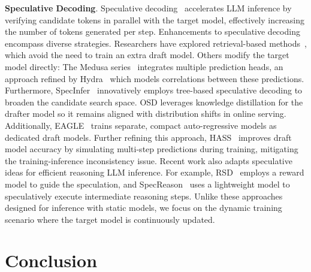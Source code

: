 \documentclass[sigplan,screen]{acmart}
\begin{document}


\noindent\textbf{Speculative Decoding}.
Speculative decoding~\cite{SpeculativeDecoding, chen2023accelerating, AdaServe} accelerates LLM inference by verifying candidate tokens in parallel with the target model, effectively increasing the number of tokens generated per step. Enhancements to speculative decoding encompass diverse strategies. Researchers have explored retrieval-based methods~\cite{REST, saxena2023PLD, lookahead}, which avoid the need to train an extra draft model. Others modify the target model directly: The Medusa series~\cite{Medusa} integrates multiple prediction heads, an approach refined by Hydra~\cite{Hydra} which models correlations between these predictions. Furthermore, SpecInfer~\cite{SpecInfer} innovatively employs tree-based speculative decoding to broaden the candidate search space. OSD \cite{OSD} leverages knowledge distillation for the drafter model so it remains aligned with distribution shifts in online serving.  Additionally, EAGLE~\cite{Eagle1, Eagle2, Eagle3} trains separate, compact auto-regressive models as dedicated draft models. Further refining this approach, HASS~\cite{HASS} improves draft model accuracy by simulating multi-step predictions during training, mitigating the training-inference inconsistency issue. Recent work also adapts speculative ideas for efficient reasoning LLM inference. For example, RSD~\cite{RSD} employs a reward model to guide the speculation, and SpecReason~\cite{SpecReason} uses a lightweight model to speculatively execute intermediate reasoning steps. Unlike these approaches designed for inference with static models, we focus on the dynamic training scenario where the target model is continuously updated.


\vspace{-15pt}
\section{Conclusion}
\label{sec_conclusion}
\end{document}
